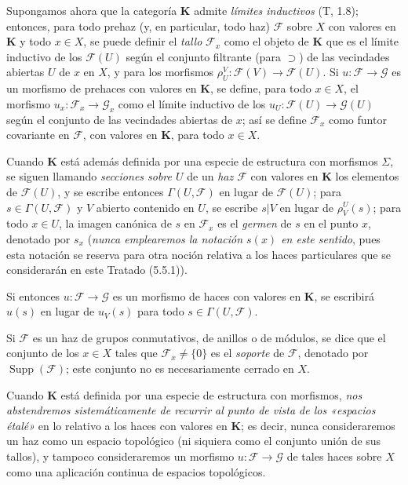 \begin{env}[3.1.6]
\label{0.3.1.6-fr}
Supongamos ahora que la categoría $\boldsymbol{K}$ admite \emph{límites
inductivos} (T, 1.8); entonces, para todo prehaz (y, en particular, todo
haz) $\mathcal{F}$ sobre $X$ con valores en $\boldsymbol{K}$ y todo $x\in X$,
se puede definir el \emph{tallo} $\mathcal{F}_x$ como el objeto de $\boldsymbol{K}$
que es el límite inductivo de los $\mathcal{F}(U)$ según el conjunto filtrante (para
$\supset$) de las vecindades abiertas $U$ de $x$ en $X$, y para los morfismos
$\rho_U^V:\mathcal{F}(V)\to\mathcal{F}(U)$. Si
$u:\mathcal{F}\to\mathcal{G}$ es un morfismo de prehaces con valores en
$\boldsymbol{K}$, se define, para todo $x\in X$, el morfismo
$u_x:\mathcal{F}_x\to\mathcal{G}_x$ como el límite inductivo de los
$u_U:\mathcal{F}(U)\to\mathcal{G}(U)$ según el conjunto de las vecindades abiertas
de $x$; así se define $\mathcal{F}_x$ como funtor covariante en
$\mathcal{F}$, con valores en $\boldsymbol{K}$, para todo $x\in X$.

Cuando $\boldsymbol{K}$ está además definida por una especie de estructura con
morfismos $\Sigma$, se siguen llamando \emph{secciones sobre $U$} de un
\emph{haz $\mathcal{F}$} con valores en $\boldsymbol{K}$ los elementos de
$\mathcal{F}(U)$, y se escribe entonces $\Gamma(U,\mathcal{F})$ en lugar de
$\mathcal{F}(U)$; para $s\in\Gamma(U,\mathcal{F})$ y $V$ abierto contenido en
$U$, se escribe $s|V$ en lugar de $\rho_V^U(s)$; para todo $x\in U$, la imagen
canónica de $s$ en $\mathcal{F}_x$ es el \emph{germen} de $s$ en el punto $x$,
denotado por $s_x$ (\emph{nunca emplearemos la notación $s(x)$ en este sentido},
pues esta notación se reserva para otra noción relativa a los haces
particulares que se considerarán en este Tratado (5.5.1)).

Si entonces $u:\mathcal{F}\to\mathcal{G}$ es un morfismo de haces con valores
en $\boldsymbol{K}$, se escribirá $u(s)$ en lugar de $u_V(s)$ para todo
$s\in\Gamma(U,\mathcal{F})$.

Si $\mathcal{F}$ es un haz de grupos conmutativos, de anillos o de
módulos, se dice que el conjunto de los $x\in X$ tales que
$\mathcal{F}_x\neq\{0\}$ es el \emph{soporte} de $\mathcal{F}$, denotado por
$\operatorname{Supp}(\mathcal{F})$; este conjunto no es necesariamente
cerrado en $X$.

Cuando $\boldsymbol{K}$ está definida por una especie de estructura con morfismos,
\emph{nos abstendremos sistemáticamente de recurrir al punto de
vista de los «espacios étalé»} en lo relativo a los haces con valores en
$\boldsymbol{K}$; es decir, nunca consideraremos un haz como
un espacio topológico (ni siquiera como el conjunto unión de sus tallos), y
tampoco consideraremos un morfismo
$u:\mathcal{F}\to\mathcal{G}$ de tales haces sobre $X$ como una aplicación
continua de espacios topológicos.
\end{env}
